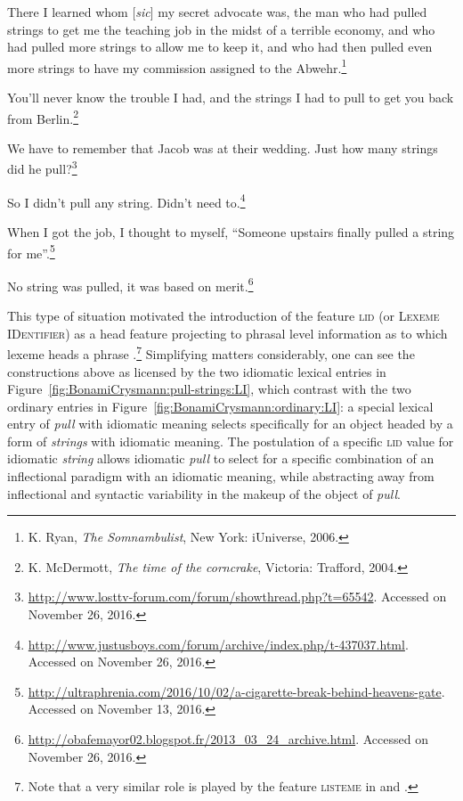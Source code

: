 \documentclass[output=paper]{langsci/langscibook}
\begin{document}
\begin{exe}
  \ex \label{ex:BonamiCrysmann:strings} \begin{xlist} \ex There I learned whom [\emph{sic}] my
    secret advocate was, the man who had pulled strings to get me the
    teaching job in the midst of a terrible economy, and who had
    pulled more strings to allow me to keep it, and who had then
    pulled even more strings to have my commission assigned to the
    Abwehr.\footnote{K. Ryan, \emph{The Somnambulist}, New York:
      iUniverse, 2006.}

    \ex You'll never know the trouble I had, and the strings I had to
    pull to get you back from Berlin.\footnote{K. McDermott, \emph{The
        time of the corncrake}, Victoria: Trafford, 2004.}

    \ex We have to remember that Jacob was at their wedding. Just how
    many strings did he
    pull?\footnote{\url{http://www.losttv-forum.com/forum/showthread.php?t=65542}. Accessed
      on November 26, 2016.}

    \ex So I didn't pull any string. Didn't need
    to.\footnote{\url{http://www.justusboys.com/forum/archive/index.php/t-437037.html}. Accessed
      on November 26, 2016.}

    \ex When I got the job, I thought to myself, ``Someone upstairs
    finally pulled a string for
    me''.\footnote{\url{http://ultraphrenia.com/2016/10/02/a-cigarette-break-behind-heavens-gate}. Accessed
      on November 13, 2016.}

    \ex No string was pulled, it was based on
    merit.\footnote{\url{http://obafemayor02.blogspot.fr/2013_03_24_archive.html}. Accessed
      on November 26, 2016.}
\end{xlist}
\end{exe}

This type of situation motivated the introduction of the feature
\textsc{lid} (or \textsc{Lexeme IDentifier}) as a head feature
projecting to phrasal level information as to which lexeme heads a
phrase \citep{Sag07,Sag12}.\footnote{Note that a very similar role is
  played by the feature \textsc{listeme} in \citet{Soehn06} and
  \citet{Richter09}. %
} Simplifying
matters considerably, one can see the constructions above as licensed
by the two idiomatic lexical entries in
Figure~\ref{fig:BonamiCrysmann:pull-strings:LI}, which contrast with the two
ordinary entries in Figure~\ref{fig:BonamiCrysmann:ordinary:LI}: a special lexical
entry of \emph{pull} with idiomatic meaning selects specifically for
an object headed by a form of \emph{strings} with idiomatic
meaning. The postulation of a specific \textsc{lid} value for
idiomatic \emph{string} allows idiomatic \emph{pull} to select for a
specific combination of an inflectional paradigm with an idiomatic
meaning, while abstracting away from inflectional and syntactic
variability in the makeup of the object of \emph{pull}.
\end{document}
